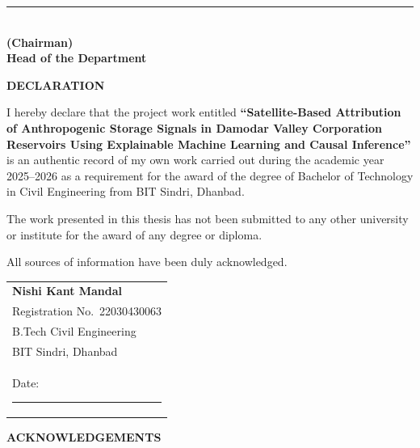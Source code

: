 \documentclass[12pt,a4paper,oneside]{report}
\begin{document}
\vspace{3cm}

\begin{center}
\rule{5cm}{0.4pt}\\
\textbf{(Chairman)}\\[1cm]
\textbf{Head of the Department}
\end{center}

\newpage
\thispagestyle{empty}
\begin{center}
{\Large\bfseries DECLARATION}
\end{center}

\vspace{1cm}

\noindent I hereby declare that the project work entitled
\textbf{``Satellite-Based Attribution of Anthropogenic Storage Signals in
Damodar Valley Corporation Reservoirs Using Explainable Machine Learning and
Causal Inference''} is an authentic record of my own work carried out during
the academic year 2025--2026 as a requirement for the award of the degree of
Bachelor of Technology in Civil Engineering from BIT Sindri, Dhanbad.

\vspace{0.5cm}

\noindent The work presented in this thesis has not been submitted to any
other university or institute for the award of any degree or diploma.

\vspace{0.5cm}

\noindent All sources of information have been duly acknowledged.

\vspace{2cm}

\noindent\begin{tabular}{l}
  \textbf{Nishi Kant Mandal} \\
  Registration No.\ 22030430063 \\
  B.Tech Civil Engineering \\
  BIT Sindri, Dhanbad \\[1cm]
  Date: \rule{3cm}{0.4pt}
\end{tabular}

\newpage
\thispagestyle{empty}
\begin{center}
{\Large\bfseries ACKNOWLEDGEMENTS}
\end{center}
\end{document}
